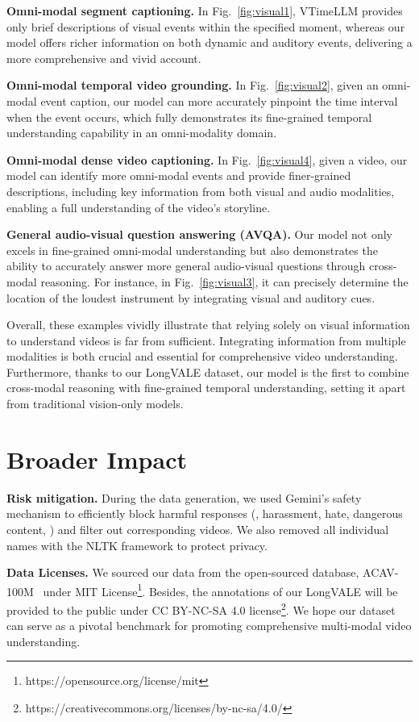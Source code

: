 \noindent\textbf{Omni-modal segment captioning.} In Fig.~\ref{fig:visual1}, VTimeLLM provides only brief descriptions of visual events within the specified moment, whereas our model offers richer information on both dynamic and auditory events, delivering a more comprehensive and vivid account.

\noindent\textbf{Omni-modal temporal video grounding.} In Fig.~\ref{fig:visual2}, given an omni-modal event caption, our model can more accurately pinpoint the time interval when the event occurs, which fully demonstrates its fine-grained temporal understanding capability in an omni-modality domain. 

\noindent\textbf{Omni-modal dense video captioning.} In Fig.~\ref{fig:visual4}, given a video, our model can identify more omni-modal events and provide finer-grained descriptions, including key information from both visual and audio modalities, enabling a full understanding of the video’s storyline.

\noindent\textbf{General audio-visual question answering (AVQA).} Our model not only excels in fine-grained omni-modal understanding but also demonstrates the ability to accurately answer more general audio-visual questions through cross-modal reasoning. For instance, in Fig.~\ref{fig:visual3}, it can precisely determine the location of the loudest instrument by integrating visual and auditory cues.

Overall, these examples vividly illustrate that relying solely on visual information to understand videos is far from sufficient. Integrating information from multiple modalities is both crucial and essential for comprehensive video understanding. Furthermore, thanks to our LongVALE dataset, our model is the first to combine cross-modal reasoning with fine-grained temporal understanding, setting it apart from traditional vision-only models.


\section{Broader Impact}
\noindent\textbf{Risk mitigation.}
During the data generation, we used Gemini's safety mechanism to efficiently block harmful responses (\ie, harassment, hate, dangerous content, \etc) and filter out corresponding videos. We also removed all individual names with the NLTK framework to protect privacy.

\noindent\textbf{Data Licenses.} We sourced our data from the open-sourced database, ACAV-100M~\cite{lee2021acav100m} under MIT License\footnote{https://opensource.org/license/mit}.
Besides, the annotations of our LongVALE will be provided to the public under CC BY-NC-SA 4.0 license\footnote{https://creativecommons.org/licenses/by-nc-sa/4.0/}. 
We hope our dataset can serve as a pivotal benchmark for promoting comprehensive multi-modal video understanding. 



